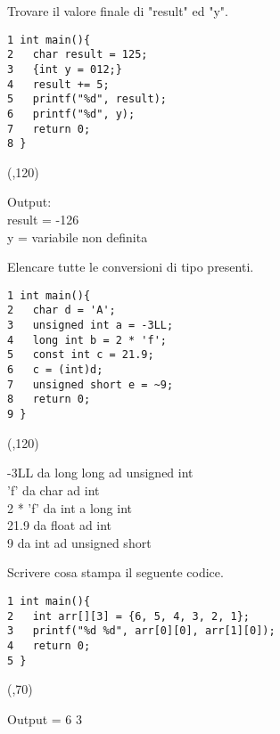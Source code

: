 \documentclass[addpoints,12pt]{exam}
\begin{document}
\begin{questions}
    \question[2] Trovare il valore finale di "result" ed "y".
    \setlength{\columnsep}{2cm}
    \begin{multicols}{2}
    \begin{verbatim}
1 int main(){
2   char result = 125;
3   {int y = 012;}
4   result += 5;
5   printf("%d", result);
6   printf("%d", y);
7   return 0;
8 }
    \end{verbatim}
    \columnbreak
    \framebox(\linewidth,120){\parbox{5cm}{
    Output:\\
    \newline
    result = -126\\
    y = variabile non definita
    }}
    \end{multicols}

    \question[2] Elencare tutte le conversioni di tipo presenti.
    \setlength{\columnsep}{2cm}
    \begin{multicols}{2}
    \begin{verbatim}
1 int main(){
2   char d = 'A';
3   unsigned int a = -3LL;
4   long int b = 2 * 'f';
5   const int c = 21.9;
6   c = (int)d;
7   unsigned short e = ~9;
8   return 0;
9 }
    \end{verbatim}
    \columnbreak
    \framebox(\linewidth,120){\parbox{6cm}{
    -3LL da long long ad unsigned int\\
    'f' da char ad int\\
    2 * 'f' da int a long int\\
    21.9 da float ad int\\
    9 da int ad unsigned short
    }}
    \end{multicols}

    \question[1] Scrivere cosa stampa il seguente codice.
    \setlength{\columnsep}{3cm}
    \begin{multicols}{2}
    \begin{verbatim}
1 int main(){
2   int arr[][3] = {6, 5, 4, 3, 2, 1};
3   printf("%d %d", arr[0][0], arr[1][0]);
4   return 0;
5 }
    \end{verbatim}
    \columnbreak
    \framebox(\linewidth,70){\parbox{3cm}{
    Output = 6 3
    }}
    \end{multicols}
\end{questions}
\end{document}
